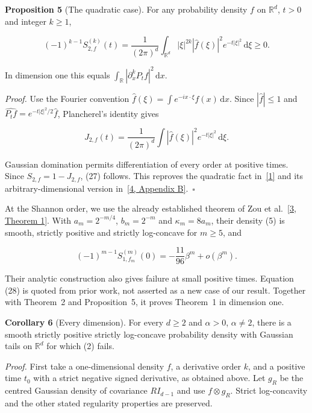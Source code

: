 \documentclass[
  11pt,
]{article}
\begin{document}
\textbf{Proposition 5} (The quadratic case). For any probability density
\(f\) on \(\mathbb R^d\), \(t>0\) and integer \(k\geq1\),

\[
\tag{27}
 (-1)^{k-1}S_{2,f}^{(k)}(t)
 =\frac1{(2\pi)^d}\int_{\mathbb R^d}|\xi|^{2k}
    |\widehat f(\xi)|^2e^{-t|\xi|^2}\,\mathrm d\xi\geq0.
\]

In dimension one this equals
\(\int_\mathbb R|\partial_x^kP_tf|^2\,\mathrm dx\).

\emph{Proof.} Use the Fourier convention
\(\widehat f(\xi)=\int e^{-ix\cdot\xi}f(x)\,\mathrm dx\). Since
\(|\widehat f|\leq1\) and \(\widehat{P_tf}=e^{-t|\xi|^2/2}\widehat f\),
Plancherel's identity gives

\[
J_{2,f}(t)=\frac1{(2\pi)^d}\int|\widehat f(\xi)|^2e^{-t|\xi|^2}\,\mathrm d\xi.
\]

Gaussian domination permits differentiation of every order at positive
times. Since \(S_{2,f}=1-J_{2,f}\), (27) follows. This reproves the
quadratic fact in~\href{https://arxiv.org/abs/2312.01819v4}{{[}1{]}} and
its arbitrary-dimensional version
in~\href{https://arxiv.org/abs/2504.01837v2}{{[}4, Appendix
B{]}}.~\(\square\)

At the Shannon order, we use the already established theorem of Zou et
al.~\href{https://arxiv.org/abs/2608.30275v1}{{[}3, Theorem 1{]}}. With
\(a_m=2^{-m/4}\), \(b_m=2^{-m}\) and \(\kappa_m=8a_m\), their density
(5) is smooth, strictly positive and strictly log-concave for
\(m\geq5\), and

\[
\tag{28}
 (-1)^{m-1}S_{1,f_m}^{(m)}(0)
 =-\frac{11}{96}\beta^m+o(\beta^m).
\]

Their analytic construction also gives failure at small positive times.
Equation (28) is quoted from prior work, not asserted as a new case of
our result. Together with Theorem~2 and Proposition~5, it proves
Theorem~1 in dimension one.

\textbf{Corollary 6} (Every dimension). For every \(d\geq2\) and
\(\alpha>0\), \(\alpha\ne2\), there is a smooth strictly positive
strictly log-concave probability density with Gaussian tails on
\(\mathbb R^d\) for which (2) fails.

\emph{Proof.} First take a one-dimensional density \(f\), a derivative
order \(k\), and a positive time \(t_0\) with a strict negative signed
derivative, as obtained above. Let \(g_R\) be the centred Gaussian
density of covariance \(RI_{d-1}\) and use \(f\otimes g_R\). Strict
log-concavity and the other stated regularity properties are preserved.
\end{document}
